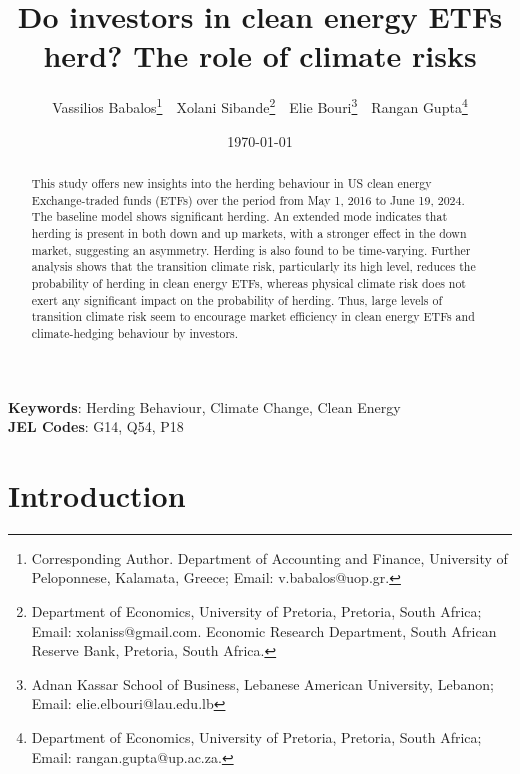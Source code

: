 \documentclass[
  letterpaper,
  DIV=11,
  numbers=noendperiod]{scrartcl}
\author{}
\date{}
\begin{document}
\title{Do investors in clean energy ETFs herd? The role of climate risks}



\author{ 
Vassilios Babalos\footnote{Corresponding Author. Department of Accounting and Finance, University of Peloponnese, Kalamata,  Greece; Email: v.babalos@uop.gr.} \,\,
Xolani Sibande\footnote{Department of Economics, University of Pretoria, Pretoria, South Africa; Email: xolaniss@gmail.com. Economic Research Department, South African Reserve Bank, Pretoria, South Africa.} \,\, 
Elie Bouri\footnote{Adnan Kassar School of Business, Lebanese American University, Lebanon; Email: elie.elbouri@lau.edu.lb} \,\,
Rangan Gupta\footnote{Department of Economics, University of Pretoria, Pretoria, South Africa; Email: rangan.gupta@up.ac.za.} 
}
\date{\today}
\maketitle

\begin{abstract}

This study offers new insights into the herding behaviour in US clean energy Exchange-traded funds (ETFs) over the period from May 1, 2016 to June 19, 2024. 
The baseline model shows significant herding. An extended mode indicates that herding is present in both down and up markets, with a stronger effect in the down market, suggesting an asymmetry. 
Herding is also found to be time-varying. Further analysis shows that the transition climate risk, particularly its high level, reduces the probability of herding in clean energy ETFs, whereas physical climate risk does not exert any significant impact on the probability of herding. 
Thus, large levels of transition climate risk seem to encourage market efficiency in clean energy ETFs  and climate-hedging behaviour by investors.

\end{abstract}

\noindent\textbf{Keywords}: Herding Behaviour, Climate Change, Clean Energy
\\
\textbf{JEL Codes}: G14, Q54, P18
\newpage


\section{Introduction}\label{introduction}
\end{document}
